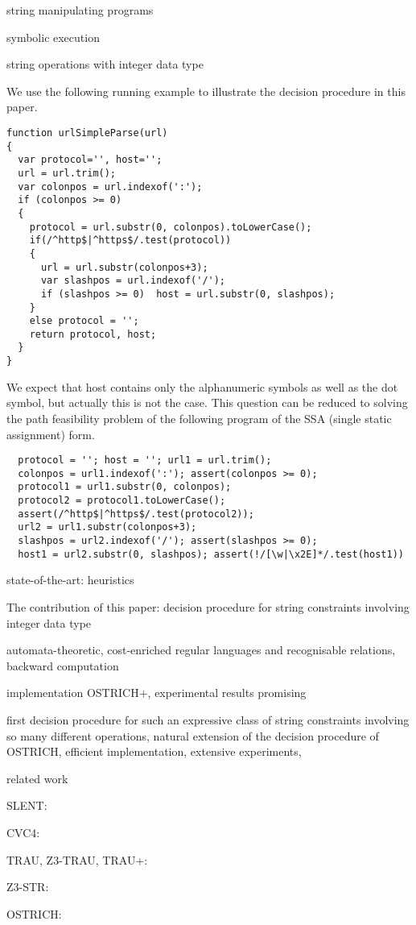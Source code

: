 
string manipulating programs

symbolic execution

string operations with integer data type

We use the following running example to illustrate the decision procedure in this paper.
{\small
\begin{verbatim}
function urlSimpleParse(url)
{
  var protocol='', host='';
  url = url.trim();
  var colonpos = url.indexof(':');
  if (colonpos >= 0) 
  {
    protocol = url.substr(0, colonpos).toLowerCase();
    if(/^http$|^https$/.test(protocol))
    {
      url = url.substr(colonpos+3);
      var slashpos = url.indexof('/');
      if (slashpos >= 0)  host = url.substr(0, slashpos); 
    }
    else protocol = '';
    return protocol, host; 
  }
}
\end{verbatim}
}

We expect that host contains only the alphanumeric symbols as well as the dot symbol, but actually this is not the case. This question can be reduced to solving the path feasibility problem of the following program of the SSA (single static assignment) form.

{\small
\begin{verbatim}
  protocol = ''; host = ''; url1 = url.trim(); 
  colonpos = url1.indexof(':'); assert(colonpos >= 0); 
  protocol1 = url1.substr(0, colonpos); 
  protocol2 = protocol1.toLowerCase();
  assert(/^http$|^https$/.test(protocol2));
  url2 = url1.substr(colonpos+3);
  slashpos = url2.indexof('/'); assert(slashpos >= 0);
  host1 = url2.substr(0, slashpos); assert(!/[\w|\x2E]*/.test(host1))
\end{verbatim}
}

state-of-the-art: heuristics

The contribution of this paper: decision procedure for string constraints involving integer data type

automata-theoretic, cost-enriched regular languages and recognisable relations, backward computation

implementation OSTRICH+, experimental results promising

first decision procedure for such an expressive class of string constraints involving so many different operations, natural extension of the decision procedure of OSTRICH, efficient implementation, extensive experiments, 


related work

SLENT: \cite{WC+18}

CVC4: \cite{cvc4}

TRAU, Z3-TRAU, TRAU+: \cite{Abdulla17,AbdullaA+19}

Z3-STR: \cite{Z3-str}

OSTRICH: \cite{CHL+19}